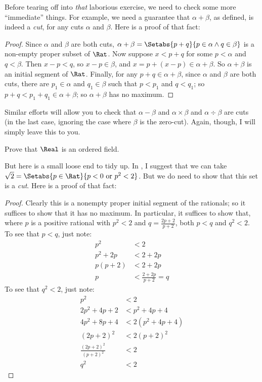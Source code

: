 \documentclass[../../../include/open-logic-section]{subfiles}
\begin{document}
Before tearing off into \emph{that} laborious exercise, we need to check some more ``immediate'' things. For example, we need a guarantee that $\alpha + \beta$, as defined, is indeed a \emph{cut}, for any cuts $\alpha$ and $\beta$. Here is a proof of that fact:
\begin{proof}	
	Since $\alpha$ and $\beta$ are both cuts, $\alpha + \beta = \Setabs{p + q}{p \in \alpha \land q \in \beta}$ is a non-empty proper subset of $\Rat$. Now suppose $x < p + q$ for some $p < \alpha$ and $q < \beta$. Then $x - p < q$, so $x - p \in \beta$, and $x = p + (x - p) \in \alpha + \beta$. So $\alpha + \beta$ is an initial segment of $\Rat$. Finally, for any $p + q \in \alpha + \beta$, since $\alpha$ and $\beta$ are both cuts, there are $p_1 \in \alpha$ and $q_1 \in \beta$ such that $p < p_1$ and $q < q_1$; so $p + q < p_1 + q_1 \in \alpha + \beta$; so $\alpha + \beta$ has no maximum.
\end{proof}\noindent 
Similar efforts will allow you to check that $\alpha - \beta$ and $\alpha \times \beta$ and $\alpha \div \beta$ are cuts (in the last case, ignoring the case where $\beta$ is the zero-cut). Again, though, I will simply leave this to you. 
\begin{prob}
	Prove that $\Real$ is an ordered field.
\end{prob}

But here is a small loose end to tidy up. In , I suggest that we can take $\sqrt{2} = \Setabs{p \in \Rat}{p < 0 \text{ or }p^2 < 2}$. But we do need to show that this set is a \emph{cut}. Here is a proof of that fact:
\begin{proof}
	Clearly this is a nonempty proper initial segment of the rationals; so it suffices to show that it has no maximum. In particular, it suffices to show that, where $p$ is a positive rational with $p^2 < 2$ and $q = \frac{2p+2}{p+2}$, both $p < q$ and $q^2 < 2$. To see that $p < q$, just note:
	\begin{align*}
		p^2 &< 2\\
		p^2 + 2p &< 2 + 2p\\
		p(p + 2) &< 2 + 2p\\
		p &< \tfrac{2+2p}{p+2} = q
	\end{align*}
	To see that $q^2 < 2$, just note:
	\begin{align*}
		p^2 &< 2\\
		2p^2 + 4p + 2 &< p^2 + 4p+ 4\\
		4p^2 + 8p + 4 &< 2(p^2 + 4p + 4)\\
		(2p+2)^2 & <2(p+2)^2\\
		\tfrac{(2p+2)^2}{(p+2)^2} &< 2\\
		q^2 &< 2
	\end{align*}
\end{proof}
\end{document}
